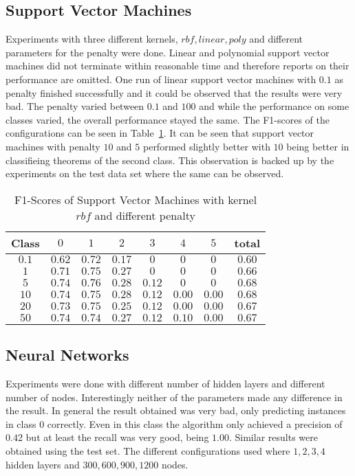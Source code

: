 \subsection{Support Vector Machines}
Experiments with three different kernels, $rbf,linear,poly$ and different parameters for the penalty were done. Linear and polynomial support vector machines did not terminate within reasonable time and therefore reports on their performance are omitted. One run of linear support vector machines with $0.1$ as penalty finished successfully and it could be observed that the results were very bad. The penalty varied between $0.1$ and $100$ and while the performance on some classes varied, the overall performance stayed the same. The F1-scores of the configurations can be seen in Table~\ref{ds2:table:svmf1}. It can be seen that support vector machines with penalty $10$ and $5$ performed slightly better with $10$ being better in classifieing theorems of the second class. This observation is backed up by the experiments on the test data set where the same can be observed.
\begin{table}[p]
	\begin{center}
		\begin{tabular}{|c|c|c|c|c|c|c|c|}
\hline Class & $0$ & $1$ & $2$ & $3$ &$4$  &$ 5$ & total \\
\hline $0.1$ & $0.62$ & $0.72$ & $0.17$ & $0$ & $0$ & $0$ & $0.60$ \\
\hline $1$ & $0.71$ & $0.75$ & $0.27$ & $0$ & $0$ & $0$ & $0.66$ \\
\hline $5$ & $0.74$ & $0.76$ &$0.28$ & $0.12$ & $0$ & $0$ & $0.68$ \\
\hline $10$ & $0.74$ & $0.75$ &$0.28$ & $0.12$ & $0.00$ &	$0.00$ & $0.68$ \\
\hline $20$ & $0.73$ & $0.75$ &$0.25$ & $0.12$ & $0.00$ & $0.00$ & $0.67$ \\
\hline $50$ & $0.74$ & $0.74$ &$0.27$ & $0.12$ & $0.10$ & $0.00$ & $0.67$ \\
\hline
	\end{tabular}
	\end{center}
	\caption{F1-Scores of Support Vector Machines with kernel $rbf$ and different penalty\label{ds2:table:svmf1}}
\end{table}

\subsection{Neural Networks}
Experiments were done with different number of hidden layers and different number of nodes. Interestingly neither of the parameters made any difference in the result. In general the result obtained was very bad, only predicting instances in class $0$ correctly. Even in this class the algorithm only achieved a precision of $0.42$ but at least the recall was very good, being $1.00$. Similar results were obtained using the test set. The different configurations used where $1,2,3,4$ hidden layers and $300,600,900,1200$ nodes. 
